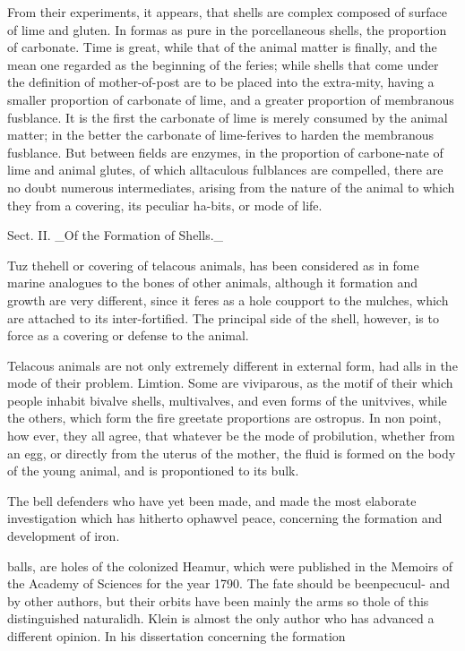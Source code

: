 \documentclass{article}
\begin{document}
From their experiments, it appears, that shells are complex composed of surface of lime and gluten. In formas as pure in the porcellaneous shells, the proportion of carbonate. Time is great, while that of the animal matter is finally, and the mean one regarded as the beginning of the feries; while shells that come under the definition of mother-of-post are to be placed into the extra-mity, having a smaller proportion of carbonate of lime, and a greater proportion of membranous fusblance. It is the first the carbonate of lime is merely consumed by the animal matter; in the better the carbonate of lime-ferives to harden the membranous fusblance. But between fields are enzymes, in the proportion of carbone-nate of lime and animal glutes, of which alltaculous fulblances are compelled, there are no doubt numerous intermediates, arising from the nature of the animal to which they from a covering, its peculiar ha-bits, or mode of life.

Sect. II. \_Of the Formation of Shells.\_

Tuz thehell or covering of telacous animals, has been considered as in fome marine analogues to the bones of other animals, although it formation and growth are very different, since it feres as a hole coupport to the mulches, which are attached to its inter-fortified. The principal side of the shell, however, is to force as a covering or defense to the animal.

Telacous animals are not only extremely different in external form, had alls in the mode of their problem. Limtion. Some are viviparous, as the motif of their which people inhabit bivalve shells, multivalves, and even forms of the unitvives, while the others, which form the fire greetate proportions are ostropus. In non point, how ever, they all agree, that whatever be the mode of probilution, whether from an egg, or directly from the uterus of the mother, the fluid is formed on the body of the young animal, and is propontioned to its bulk.

The bell defenders who have yet been made, and made the most elaborate investigation which has hitherto ophawvel peace, concerning the formation and development of iron.

balls, are holes of the colonized Heamur, which were published in the Memoirs of the Academy of Sciences for the year 1790. The fate should be beenpecucul- and by other authors, but their orbits have been mainly the arms so thole of this distinguished naturalidh. Klein is almost the only author who has advanced a different opinion. In his dissertation concerning the formation
\end{document}
